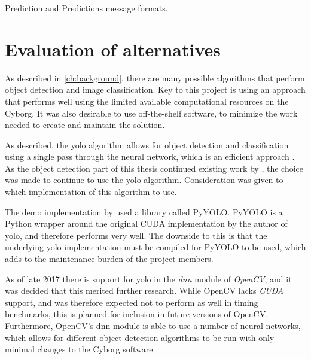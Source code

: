 \documentclass[\rootfolder/main.tex]{subfiles}
\begin{document}
\begin{listing}
    \inputminted{python}{\rootfolder/Chapters/Chapter5/Listings/Prediction.msg}
    \inputminted{python}{\rootfolder/Chapters/Chapter5/Listings/Predictions.msg}
    \caption{Prediction and Predictions message formats.}
    \label{lst:prediction-msg}
\end{listing}


\section{Evaluation of alternatives}

As described in \cref{ch:background}, there are many possible algorithms that perform object detection and image classification.
Key to this project is using an approach that performs well using the limited available computational resources on the Cyborg.
It was also desirable to use off-the-shelf software, to minimize the work needed to create and maintain the solution.

As described, the \acrshort{yolo} algorithm allows for object detection and classification using a single pass through the neural network, which is an efficient approach \cite{Redmon2015}.
As the object detection part of this thesis continued existing work by \cite{Opheim2018}, the choice was made to continue to use the \acrshort{yolo} algorithm.
Consideration was given to which implementation of this algorithm to use.

The demo implementation by \cite{Opheim2018} used a library called PyYOLO.
PyYOLO is a Python wrapper around the original CUDA implementation by the author of \acrshort{yolo}, and therefore performs very well.
The downside to this is that the underlying \acrshort{yolo} implementation must be compiled for PyYOLO to be used, which adds to the maintenance burden of the project members.

As of late 2017 there is support for \acrshort{yolo} in the \emph{\acrfull{dnn}} module of \emph{OpenCV}, and it was decided that this merited further research.
While OpenCV lacks \emph{CUDA} support, and was therefore expected not to perform as well in timing benchmarks, this is planned for inclusion in future versions of OpenCV.
Furthermore, OpenCV's \acrshort{dnn} module is able to use a number of neural networks, which allows for different object detection algorithms to be run with only minimal changes to the Cyborg software.
\end{document}
